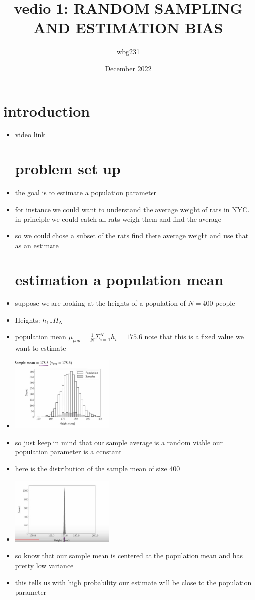 \documentclass{article}
\title{vedio 1: RANDOM SAMPLING AND ESTIMATION BIAS}
\author{wbg231 }
\date{December 2022}
\begin{document}
\maketitle

\section{introduction}
\begin{itemize}
\item \href{https://www.youtube.com/watch?v=iPTTn-hPg_0}{video link}
\section{problem set up}
\item the goal is to estimate  a population parameter
\item for instance we could want to understand the average weight of rats in NYC. in principle we could catch all rats weigh them and find the average
\item so we could chose a subset of the rats find there average weight and use that as an estimate 
\section{estimation a population mean}
\item suppose we are looking at the heights of a population of $N=400$ people
\item Heights: $h_1..H_N$
\item population mean $\mu_{pop}=\frac{1}{N}\Sigma_{i=1}^{N}h_i=175.6$ note that this is a fixed value we want to estimate
\item\includegraphics[width=5cm]{notes/week_3/Video-1:RANDOM-SAMPLING-AND-ESTIMATION-BIAS/immages/v1_1.jpg}
\item so just keep in mind that our sample average is a random viable our population parameter is a constant 
\item here is the distribution of the sample mean of size 400 \item\includegraphics[width=5cm]{notes/week_3/Video-1:RANDOM-SAMPLING-AND-ESTIMATION-BIAS/immages/v2_2.jpg}
\item so know that our sample mean is centered at the population mean and has pretty low variance 
\item this tells us with high probability our estimate will be close to the population parameter 

\end{itemize}
\end{document}
